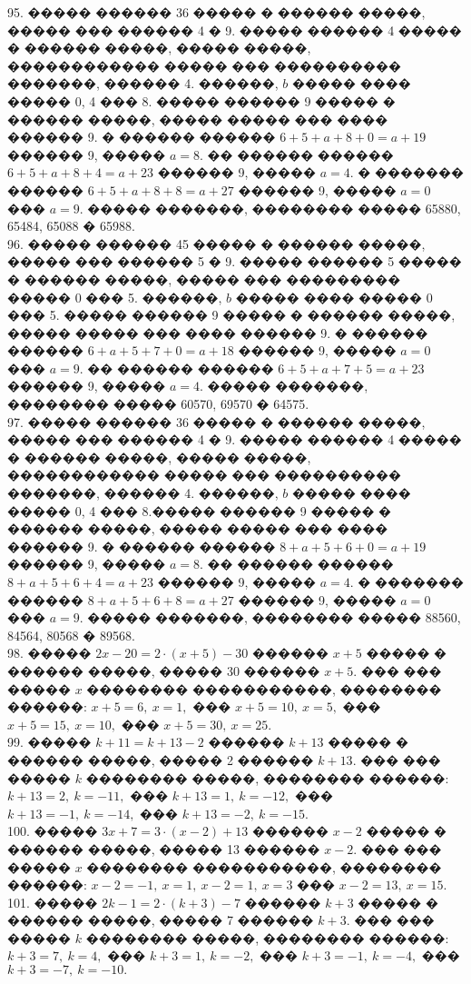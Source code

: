 \documentclass[12pt]{article}
\begin{document}
95. ����� ������ 36 ����� � ������ �����, ����� ��� ������ 4 � 9. ����� ������ 4 ����� � ������ �����, ����� �����, ������������ ����� ��� ���������� �������, ������ 4. ������, $b$ ����� ���� ����� 0, 4 ��� 8. ����� ������ 9 ����� � ������ �����, ����� ����� ��� ���� ������ 9. � ������ ������ $6+5+a+8+0=a+19$ ������ 9, ����� $a=8.$ �� ������ ������ $6+5+a+8+4=a+23$ ������ 9, ����� $a=4.$ � ������� ������ $6+5+a+8+8=a+27$ ������ 9, ����� $a=0$ ��� $a=9.$ ����� �������, �������� ����� 65880, 65484, 65088 � 65988.\\
96. ����� ������ 45 ����� � ������ �����, ����� ��� ������ 5 � 9. ����� ������ 5 ����� � ������ �����, ����� ��� ��������� ����� 0 ��� 5. ������, $b$ ����� ���� ����� 0 ��� 5. ����� ������ 9 ����� � ������ �����, ����� ����� ��� ���� ������ 9. � ������ ������ $6+a+5+7+0=a+18$ ������ 9, ����� $a=0$ ��� $a=9.$ �� ������ ������ $6+5+a+7+5=a+23$ ������ 9, ����� $a=4.$ ����� �������, �������� ����� 60570, 69570 � 64575.\\
97. ����� ������ 36 ����� � ������ �����, ����� ��� ������ 4 � 9. ����� ������ 4 ����� � ������ �����, ����� �����, ������������ ����� ��� ���������� �������, ������ 4. ������, $b$ ����� ���� ����� 0, 4 ��� 8.����� ������ 9 ����� � ������ �����, ����� ����� ��� ���� ������ 9. � ������ ������ $8+a+5+6+0=a+19$ ������ 9, ����� $a=8.$ �� ������ ������ $8+a+5+6+4=a+23$ ������ 9, ����� $a=4.$ � ������� ������ $8+a+5+6+8=a+27$ ������ 9, ����� $a=0$ ��� $a=9.$ ����� �������, �������� ����� 88560, 84564, 80568 � 89568.\\
98. ����� $2x-20=2\cdot(x+5)-30$ ������ $x+5$ ����� � ������ �����, ����� 30 ������ $x+5.$ ��� ��� ����� $x$ �������� �����������, �������� ������: $x+5=6,\ x=1,$ ��� $x+5=10,\ x=5,$ ��� $x+5=15,\ x=10,$ ��� $x+5=30,\ x=25.$\\
99. ����� $k+11=k+13-2$ ������ $k+13$ ����� � ������ �����, ����� 2 ������ $k+13.$ ��� ��� ����� $k$ �������� �����, �������� ������: $k+13=2,\ k=-11,$ ��� $k+13=1,\ k=-12,$ ��� $k+13=-1,\ k=-14,$ ��� $k+13=-2,\ k=-15.$\\
100. ����� $3x+7=3\cdot(x-2)+13$ ������ $x-2$ ����� � ������ �����, ����� 13 ������ $x-2.$ ��� ��� ����� $x$ �������� �����������, �������� ������: $x-2=-1,\ x=1,\ x-2=1,\ x=3$ ��� $x-2=13,\ x=15.$\\
101. ����� $2k-1=2\cdot(k+3)-7$ ������ $k+3$ ����� � ������ �����, ����� 7 ������ $k+3.$ ��� ��� ����� $k$ �������� �����, �������� ������: $k+3=7,\ k=4,$ ��� $k+3=1,\ k=-2,$ ��� $k+3=-1,\ k=-4,$ ��� $k+3=-7,\ k=-10.$\\
\end{document}
